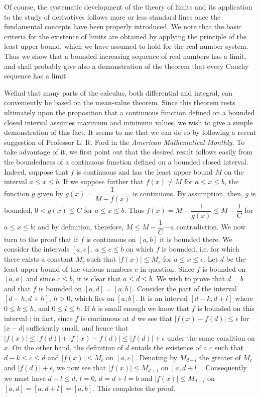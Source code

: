 Of course, the systematic development of the theory of limits and its
application to the study of derivatives follows more or less standard
lines once the fundamental concepts have been properly introduced. We
note that the basic criteria for the existence of limits are obtained
by applying the principle of the least upper bound, which we have
assumed to hold for the real number system. Thus we show that a
bounded increasing sequence of real numbers has a limit, and shall
probably give also a demonstration of the theorem  that every Cauchy
sequence has a limit.

We\pageoriginale find that many parts of the calculus, both
differential and integral, can conveniently be based on the mean-value
theorem. Since this theorem rests ultimately upon the proposition that
a continuous function defined on a bounded closed interval assumes
maximum and minimum values, we wish to give a simple demonstration of
this fact. It seems to me that we can do so by following a recent
suggestion of Professor L. R. Ford in the \textit{American
  Mathematical Monthly.} To take advantage of it, we first point out
that the desired result follows easily from the boundedness of a
continuous function defined on a bounded closed interval. Indeed,
suppose that $f$ is continuous and has the least upper bound $M$ on
the interval $a \leqslant x \leqslant b$. If we suppose further that
$f(x) \neq M$ for $a \leqslant x \leqslant b$, the function $g$ given
by $g(x) = \dfrac{1}{M - f(x)}$ is continuous. By assumption, then,
$g$ is bounded, $0 < g(x) \leqslant C$ for $a \leqslant x \leqslant
b$. Thus $f(x) = M - \dfrac{1}{g(x)} \leqslant M - \dfrac{1}{C}$ for
$a \leqslant x \leqslant b$; and by definition, therefore, $M
\leqslant M - \dfrac{1}{C}$---a contradiction. We now turn to the
proof that if $f$ is continuous on $[a,b]$ it is bounded there. We
consider the intervals $[a,c]$, $a \leqslant c \leqslant b$ on which
$f$ is bounded, i.e. for which there exists a constant $M_c$ such that
$|f(x)| \leqslant M_c$ for $a \leqslant x \leqslant c$. Let $d$ be the
least upper bound of the various numbers $c$ in question. Since $f$ is
bounded on $[a,a]$ and since $c \leqslant b$, it is clear that $a
\leqslant d \leqslant b$. We wish to prove that $d = b$ and that $f$
is bounded on $[a,d] = [a,b]$. Consider the part of the interval
$[d-h, d+h]$, $h>0$, which lies on $[a,b]$. It is an interval $[d-k,
  d+l]$ where $0 \leqslant k \leqslant h$, and $0 \leqslant l
\leqslant h$. If $h$ is small enough we know that $f$ is bounded on
this interval : in fact, since $f$ is continuous at $d$ we see that
$|f(x) - f(d)| \leqslant \epsilon$ for $|x -d|$ sufficiently small,
and hence that $|f(x)| \leqslant |f(d)| + |f(x) - f(d)| \leqslant
|f(d)| + \epsilon$ under the same condition on $x$. On the other hand,
the definition of $d$ entails the existence of a $c$ such that $d - k
\leqslant c \leqslant d$ and $|f(x)| \leqslant M_c$ on $[a,c]$. Denoting
by $M_{d+l}$ the greater of $M_c$ and $|f(d)| + \epsilon$, we now see
that $|f(x)| \leqslant M_{d+l}$ on $[a, d + l]$. Consequently we must
have $d+ l \leqslant d$, $l = 0$, $d = d + l =b$ and $|f(x)|
\leqslant M_{d+l}$ on $[a,d] = [a,d + l] = [a,b]$. This completes the
proof.


